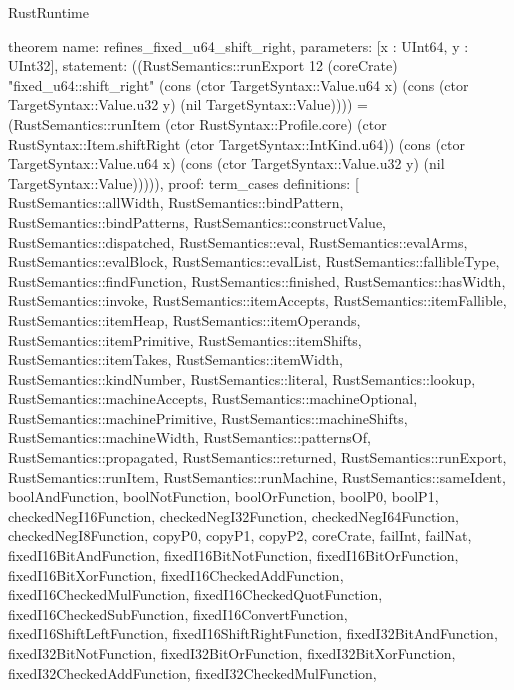 \begin{lexlean}{RustRuntime}
\begin{semanticmodule}
theorem{
  name: refines_fixed_u64_shift_right,
  parameters: [x : UInt64, y : UInt32],
  statement: ((RustSemantics::runExport 12 (coreCrate) "fixed_u64::shift_right" (cons (ctor TargetSyntax::Value.u64 x) (cons (ctor TargetSyntax::Value.u32 y) (nil TargetSyntax::Value)))) = (RustSemantics::runItem (ctor RustSyntax::Profile.core) (ctor RustSyntax::Item.shiftRight (ctor TargetSyntax::IntKind.u64)) (cons (ctor TargetSyntax::Value.u64 x) (cons (ctor TargetSyntax::Value.u32 y) (nil TargetSyntax::Value))))),
  proof: term_cases{
    definitions: [
      RustSemantics::allWidth,
      RustSemantics::bindPattern,
      RustSemantics::bindPatterns,
      RustSemantics::constructValue,
      RustSemantics::dispatched,
      RustSemantics::eval,
      RustSemantics::evalArms,
      RustSemantics::evalBlock,
      RustSemantics::evalList,
      RustSemantics::fallibleType,
      RustSemantics::findFunction,
      RustSemantics::finished,
      RustSemantics::hasWidth,
      RustSemantics::invoke,
      RustSemantics::itemAccepts,
      RustSemantics::itemFallible,
      RustSemantics::itemHeap,
      RustSemantics::itemOperands,
      RustSemantics::itemPrimitive,
      RustSemantics::itemShifts,
      RustSemantics::itemTakes,
      RustSemantics::itemWidth,
      RustSemantics::kindNumber,
      RustSemantics::literal,
      RustSemantics::lookup,
      RustSemantics::machineAccepts,
      RustSemantics::machineOptional,
      RustSemantics::machinePrimitive,
      RustSemantics::machineShifts,
      RustSemantics::machineWidth,
      RustSemantics::patternsOf,
      RustSemantics::propagated,
      RustSemantics::returned,
      RustSemantics::runExport,
      RustSemantics::runItem,
      RustSemantics::runMachine,
      RustSemantics::sameIdent,
      boolAndFunction,
      boolNotFunction,
      boolOrFunction,
      boolP0,
      boolP1,
      checkedNegI16Function,
      checkedNegI32Function,
      checkedNegI64Function,
      checkedNegI8Function,
      copyP0,
      copyP1,
      copyP2,
      coreCrate,
      failInt,
      failNat,
      fixedI16BitAndFunction,
      fixedI16BitNotFunction,
      fixedI16BitOrFunction,
      fixedI16BitXorFunction,
      fixedI16CheckedAddFunction,
      fixedI16CheckedMulFunction,
      fixedI16CheckedQuotFunction,
      fixedI16CheckedSubFunction,
      fixedI16ConvertFunction,
      fixedI16ShiftLeftFunction,
      fixedI16ShiftRightFunction,
      fixedI32BitAndFunction,
      fixedI32BitNotFunction,
      fixedI32BitOrFunction,
      fixedI32BitXorFunction,
      fixedI32CheckedAddFunction,
      fixedI32CheckedMulFunction,
}}
\end{semanticmodule}
\end{lexlean}
